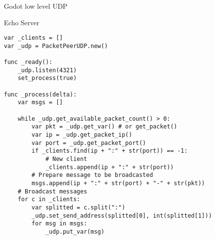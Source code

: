 \begin{frame}[fragile]{Godot low level UDP}

Echo Server

\begin{lstlisting}
var _clients = []
var _udp = PacketPeerUDP.new()

func _ready():
    _udp.listen(4321)
    set_process(true)

func _process(delta):
    var msgs = []

    while _udp.get_available_packet_count() > 0:
        var pkt = _udp.get_var() # or get_packet()
        var ip = _udp.get_packet_ip()
        var port = _udp.get_packet_port()
        if _clients.find(ip + ":" + str(port)) == -1:
            # New client
            _clients.append(ip + ":" + str(port))
        # Prepare message to be broadcasted
        msgs.append(ip + ":" + str(port) + "-" + str(pkt))
    # Broadcast messages
    for c in _clients:
        var splitted = c.split(":")
        _udp.set_send_address(splitted[0], int(splitted[1]))
        for msg in msgs:
            _udp.put_var(msg)
\end{lstlisting}

\end{frame}